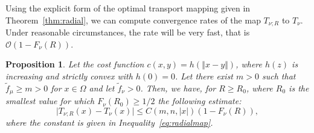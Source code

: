 \documentclass{amsart}
\theoremstyle{lemma}
\newtheorem{proposition}[theorem]{Proposition}
\theoremstyle{remark}
\begin{document}
Using the explicit form of the optimal transport mapping given in Theorem~\ref{thm:radial}, we can compute convergence rates of the map $T_{\nu; R}$ to $T_{\nu}$. Under reasonable circumstances, the rate will be very fast, that is $\mathcal{O}(1 - F_{\nu}(R))$.

\begin{proposition}\label{prop:radialmap}
Let the cost function $c(x,y) = h(\left\Vert x - y \right\Vert)$, where $h(z)$ is increasing and strictly convex with $h(0) = 0$. Let there exist $m>0$ such that $\tilde{f}_{\mu} \geq m>0$ for $x \in \Omega$ and let $\tilde{f}_{\nu} >0$. Then, we have, for $R \geq R_0$, where $R_0$ is the smallest value for which $F_{\nu}(R_0) \geq 1/2$ the following estimate:
\begin{equation}\label{eq:rate}
\vert T_{\nu;R}(x) - T_{\nu}(x) \vert \leq C(m, n, \vert x \vert) (1-F_{\nu}(R)),
\end{equation}
where the constant is given in Inequality~\eqref{eq:radialmap}.
\end{proposition}
\end{document}
